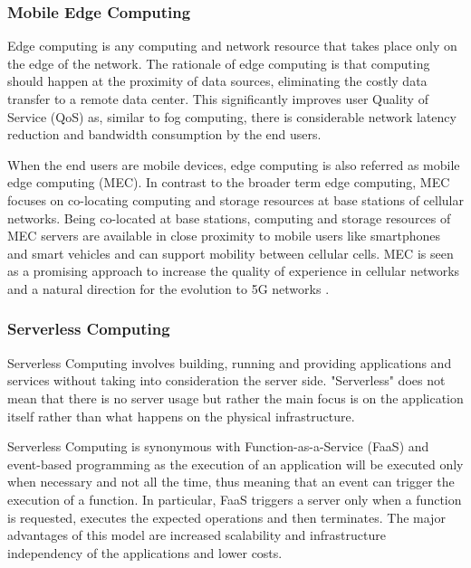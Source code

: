\documentclass{ieeeaccess}
\begin{document}
\subsubsection{Mobile Edge Computing}

Edge computing \cite{edge-computing-vision-challenges} is any computing and network resource that takes place only on the edge of the network. The rationale of edge computing is that computing should happen at the proximity of data sources, eliminating the costly data transfer to a remote data center. This significantly improves user Quality of Service (QoS) as, similar to fog computing, there is considerable network latency reduction and bandwidth consumption by the end users.

When the end users are mobile devices, edge computing is also referred as mobile edge computing (MEC). In contrast to the broader term edge computing, MEC focuses on co-locating computing and storage resources at base stations of cellular networks. Being co-located at base stations, computing and storage resources of MEC servers are available in close proximity to mobile users like smartphones and smart vehicles and can support mobility between cellular cells. MEC is seen as a promising approach to increase the quality of experience in cellular networks and a natural direction for the evolution to 5G networks \cite{nfv-5g}.

\subsubsection{Serverless Computing}

Serverless Computing \cite{serverless-berkeley} involves building, running and providing applications and services without taking into consideration the server side. "Serverless" does not mean that there is no server usage but rather the main focus is on the application itself rather than what happens on the physical infrastructure.

Serverless Computing is synonymous with Function-as-a-Service (FaaS) and event-based programming as the execution of an application will be executed only when necessary and not all the time, thus meaning that an event can trigger the execution of a function. In particular, FaaS triggers a server only when a function is requested, executes the expected operations and then terminates. The major advantages of this model are increased scalability and infrastructure independency of the applications and lower costs.
\end{document}

